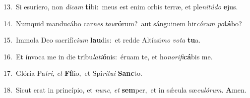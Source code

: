 {\numbfont\textcolor{\numbcolor}{13.}}~Si esuríero, non \textit{di}\-\textit{cam} \textbf{ti}\-bi:~\star meus est enim orbis terræ, et ple\-\textit{ni}\-\textit{tú}\textit{do} \textbf{e}\-jus.\par
{\numbfont\textcolor{\numbcolor}{14.}}~Numquid manducábo car\textit{nes} \textit{tau}\-\textbf{ró}rum?~\star aut sánguinem hir\-\textit{có}\-\textit{rum} \textit{po}\-\textbf{tá}bo?\par
{\numbfont\textcolor{\numbcolor}{15.}}~Immola Deo sacrifí\-\textit{ci}\-\textit{um} \textbf{lau}\-dis:~\star et redde Altíssi\textit{mo} \textit{vo}\-\textit{ta} \textbf{tu}\-a.\par
{\numbfont\textcolor{\numbcolor}{16.}}~Et ínvoca me in die tribu\-\textit{la}\-\textit{ti}\textbf{ó}nis:~\star éruam te, et ho\-\textit{no}\-\textit{ri}\textit{fi}\textbf{cá}bis me.\par
{\numbfont\textcolor{\numbcolor}{17.}}~Glória Pa\-\textit{tri}\-, \textit{et} \textbf{Fí}\-lio,~\star et Spi\-\textit{rí}\-\textit{tu}\textit{i} \textbf{Sanc}\-to.\par
{\numbfont\textcolor{\numbcolor}{18.}}~Sicut erat in princípio, et \textit{nunc}\-, \textit{et} \textbf{sem}\-per,~\star et in sǽcula sæ\-\textit{cu}\-\textit{ló}\textit{rum}. \textbf{A}\-men.\par
